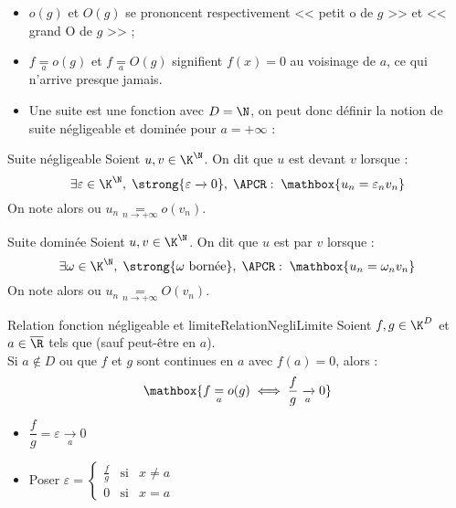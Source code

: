 \documentclass[12pt,a4paper]{report}
\begin{document}
\begin{remarque}[Remarques]
    \begin{itemize}
        \item $o(g)$ et $O(g)$ se prononcent respectivement << petit o de $g$ >> et << grand O de $g$ >> ;
        \item[\danger] $f \underset{a}{=} o(g)$ et $f \underset{a}{=} O(g)$ signifient $f(x) = 0$ au voisinage de $a$, ce qui n'arrive presque jamais.
        \item Une suite est une fonction avec $D = \N$, on peut donc définir la notion de suite négligeable et dominée pour $a = +\infty$ :
    \end{itemize}
\end{remarque}

\begin{definition}{Suite négligeable}{}
    Soient $u, v \in \K^\N$. On dit que $u$ est  devant $v$ lorsque :
    $$
    \exists \varepsilon \in \K^\N, \;
    \strong{\varepsilon \xrightarrow{} 0}, \;
    \APCR : \;
    \mathbox{u_n = \varepsilon_n v_n}
    $$
    On note alors  ou $u_n \underset{n \to +\infty}{=} o(v_n)$.
\end{definition}

\begin{definition}{Suite dominée}{}
    Soient $u, v \in \K^\N$. On dit que $u$ est  par $v$ lorsque :
    $$
    \exists \omega \in \K^\N, \;
    \strong{\omega \text{ bornée}}, \;
    \APCR : \;
    \mathbox{u_n = \omega_n v_n}
    $$
    On note alors  ou $u_n \underset{n \to +\infty}{=} O(v_n)$.
\end{definition}

\begin{proposition}{Relation fonction négligeable et limite}{RelationNegliLimite}
    Soient $f, g \in \K^D$ et $a \in \overline{\R}$ tels que  (sauf peut-être en $a$).\\
    Si $a \not\in D$ ou que $f$ et $g$ sont continues en $a$ avec $f(a) = 0$, alors :
    $$
    \mathbox{f \underset{a}{=} o(g) \; \Longleftrightarrow \; \dfrac{f}{g} \xrightarrow[a]{} 0}
    $$
\end{proposition}

\begin{demo}
    \begin{multicols}{2}
    \begin{itemize}
        \item[\circled{$\Rightarrow$}] $\dfrac{f}{g} = \varepsilon \xrightarrow[a]{} 0$
        \item[\circled{$\Leftarrow$}] Poser $\varepsilon = \left\{ \begin{array}{ccc} \frac{f}{g} & \text{si} & x \neq a \\ 0 & \text{si} & x = a \end{array} \right.$
    \end{itemize}
    \end{multicols}
\end{demo}
\end{document}
